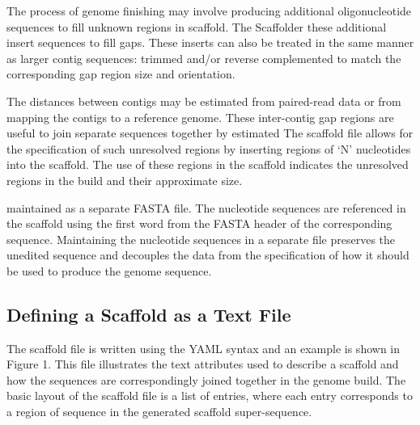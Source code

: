 \documentclass[10pt]{bmc_article}
\newenvironment{bmcformat}{\begin{raggedright}\baselineskip20pt\sloppy\setboolean{publ}{false}}{\end{raggedright}\baselineskip20pt\sloppy}
\begin{document}
\begin{bmcformat}
The process of genome finishing may involve producing additional
oligonucleotide sequences to fill unknown regions in  scaffold.
 The Scaffolder  these additional insert sequences  to fill 
gaps. These inserts can also be treated in the same manner as larger contig
sequences: trimmed and/or reverse complemented to match the corresponding gap
region size and orientation. \pb

The distances between contigs may be estimated from paired-read data or from
mapping the contigs to a reference genome. These inter-contig gap regions are
useful to join separate sequences together by  estimated
 The scaffold file allows for the specification
of such unresolved regions by inserting regions of `N' nucleotides into the
scaffold. The use of these regions in the scaffold indicates the unresolved
regions in the build and their approximate size. \pb


 maintained as
a separate FASTA file. The nucleotide sequences
 are referenced in the scaffold using the
first word from  the FASTA header of the corresponding sequence.
Maintaining the nucleotide sequences in a separate file preserves the unedited
sequence and decouples the data from the specification of how it should be
used to produce the genome sequence. \pb

\subsection*{Defining a Scaffold as a Text File} %

The scaffold file is written using the YAML syntax and an example is shown in
Figure 1. This file illustrates the text attributes used to describe
a scaffold and how the sequences are correspondingly joined together in the
genome build. The basic layout of the scaffold file is a list of entries,
where each entry corresponds to a region of sequence in the generated scaffold
super-sequence. \pb


\end{bmcformat}
\end{document}
